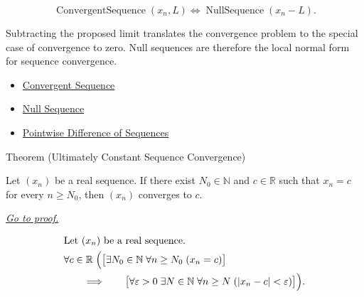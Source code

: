 \begin{remark*}
\[
\operatorname{ConvergentSequence}(x_n,L)
\Longleftrightarrow
\operatorname{NullSequence}(x_n - L).
\]
\end{remark*}

\begin{remark*}[Interpretation]
Subtracting the proposed limit translates the convergence problem to the
special case of convergence to zero. Null sequences are therefore the local
normal form for sequence convergence.
\end{remark*}

\begin{dependencies}
\begin{itemize}
  \item \hyperref[def:convergent-sequence]{Convergent Sequence}
  \item \hyperref[def:null-sequence]{Null Sequence}
  \item \hyperref[def:pointwise-difference-sequence]{Pointwise Difference of Sequences}
\end{itemize}
\end{dependencies}


\begin{theorembox}{Theorem (Ultimately Constant Sequence Convergence)}
\begin{theorem}
\label{thm:ultimately-constant-sequence-convergence}
Let $(x_n)$ be a real sequence. If there exist $N_0 \in \mathbb{N}$ and
$c \in \mathbb{R}$ such that $x_n = c$ for every $n \ge N_0$, then
$(x_n)$ converges to $c$.

\smallskip
\noindent
\hyperref[prf:ultimately-constant-sequence-convergence]{\textit{Go to proof.}}
\end{theorem}
\end{theorembox}

\begin{remark*}
\[
\begin{aligned}
&\text{Let } (x_n) \text{ be a real sequence.}\\
&\forall c \in \mathbb{R}\;
\Bigl(
\bigl[
\exists N_0 \in \mathbb{N}\;
\forall n \ge N_0\;(x_n = c)
\bigr]\\
&\qquad\Longrightarrow\qquad
\bigl[
\forall \varepsilon > 0\;
\exists N \in \mathbb{N}\;
\forall n \ge N\;(|x_n - c| < \varepsilon)
\bigr]
\Bigr).
\end{aligned}
\]
\end{remark*}

